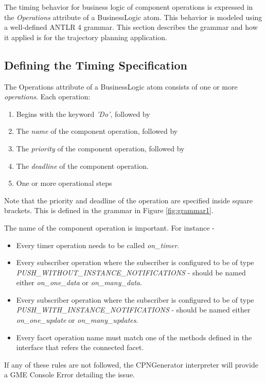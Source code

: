 The timing behavior for business logic of component operations is expressed in the \emph{Operations} attribute of a BusinessLogic atom. This behavior is modeled using a well-defined ANTLR 4 grammar. This section describes the grammar and how it applied is for the trajectory planning application. 

\subsection{Defining the Timing Specification}

The Operations attribute of a BusinessLogic atom consists of one or more \emph{operations}. Each operation: 
\begin{enumerate}
\item Begins with the keyword \emph{'Do'}, followed by
\item The \emph{name} of the component operation, followed by
\item The \emph{priority} of the component operation, followed by
\item The \emph{deadline} of the component operation.
\item One or more operational steps
\end{enumerate}

Note that the priority and deadline of the operation are specified inside square brackets. This is defined in the grammar in Figure \ref{fig:grammar1}.

The name of the component operation is important. For instance - 
\begin{itemize}
\item Every timer operation needs to be called \emph{on\_timer}.
\item Every subscriber operation where the subscriber is configured to be of type \emph{PUSH\_WITHOUT\_INSTANCE\_NOTIFICATIONS} - should be named either \emph{on\_one\_data} or \emph{on\_many\_data}. 
\item Every subscriber operation where the subscriber is configured to be of type \emph{PUSH\_WITH\_INSTANCE\_NOTIFICATIONS} - should be named either \emph{on\_one\_update} or \emph{on\_many\_updates}. 
\item Every facet operation name must match one of the methods defined in the interface that refers the connected facet. 
\end{itemize}

If any of these rules are not followed, the CPNGenerator interpreter will provide a GME Console Error detailing the issue.

